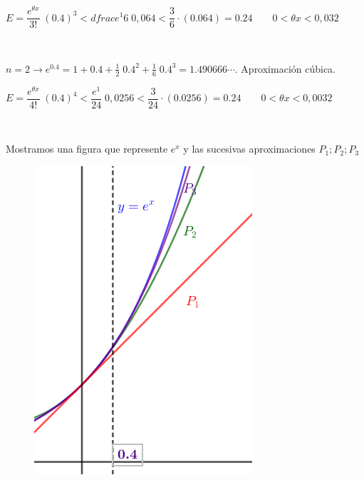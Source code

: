 \begin{ejem}
	$E=\dfrac {e^{\theta x}}{3!}\; (0.4)^3 < dfrac {e^1}{6}\; 0,064 < \dfrac {3}{6} \cdot (0.064)=0.24 \qquad 0<\theta x< 0,032$
	
	
	\begin{multicols}{2}

	$\quad$
	
	$n=2 \to e^{0.4}=1+0.4+\frac 1 2 \; 0.4^2+ \frac 1 {6}\; 0.4^3 =1.490666\cdots $. Aproximación cúbica.
	
	$E=\dfrac {e^{\theta x}}{4!}\; (0.4)^4 < \dfrac {e^1}{24}\; 0,0256 < \dfrac {3}{24} \cdot (0.0256)=0.24 \qquad 0<\theta x< 0,0032$
	
	$\quad$
	
	Mostramos una figura que represente $e^x$ y las sucesivas aproximaciones $ P_1; P_2; P_3$
	
	\begin{figure}[H]
	\centering
		\includegraphics[width=.3\textwidth]{imagenes/imagenes06/T06IM04.png}
		\end{figure}
	\end{multicols}
	\end{ejem}
	 
